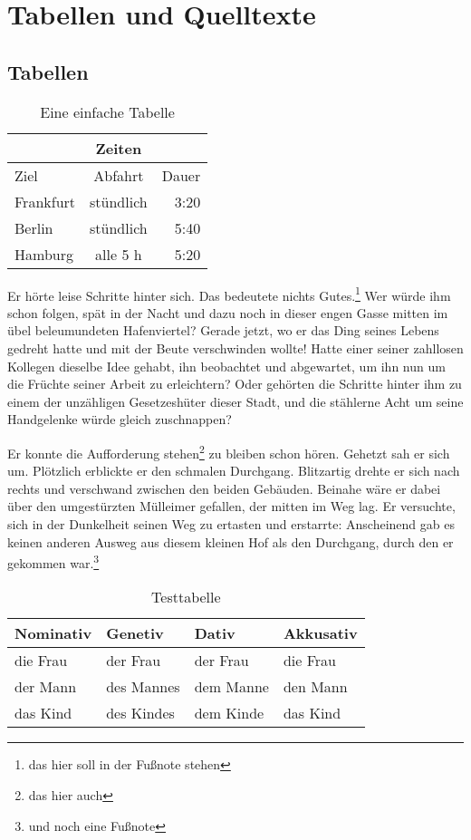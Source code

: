 \chapter{Tabellen und Quelltexte}
\section{Tabellen}
\blindtext

\begin{table}[htb]
  \centering
  \caption{Eine einfache Tabelle}
  \begin{tabular}{lcr}
          & Zeiten     &   \\ 
    \toprule
    Ziel      & Abfahrt    & Dauer \\ 
    \midrule
    Frankfurt & stündlich & 3:20 \\ 
    Berlin    & stündlich & 5:40 \\ 
    Hamburg   & alle 5 h  & 5:20 \\ 
    \bottomrule
  \end{tabular}
\end{table}

Er hörte leise Schritte hinter sich. Das bedeutete nichts Gutes.\footnote{das hier soll in der Fußnote stehen} Wer würde ihm schon folgen, spät in der Nacht und dazu noch in dieser engen Gasse mitten im übel beleumundeten Hafenviertel? Gerade jetzt, wo er das Ding seines Lebens gedreht hatte und mit der Beute verschwinden wollte! Hatte einer seiner zahllosen Kollegen dieselbe Idee gehabt, ihn beobachtet und abgewartet, um ihn nun um die Früchte seiner Arbeit zu erleichtern? Oder gehörten die Schritte hinter ihm zu einem der unzähligen Gesetzeshüter dieser Stadt, und die stählerne Acht um seine Handgelenke würde gleich zuschnappen?

Er konnte die Aufforderung stehen\footnote{das hier auch} zu bleiben schon hören. Gehetzt sah er sich um. Plötzlich erblickte er den schmalen Durchgang. Blitzartig drehte er sich nach rechts und verschwand zwischen den beiden Gebäuden. Beinahe wäre er dabei über den umgestürzten Mülleimer gefallen, der mitten im Weg lag. Er versuchte, sich in der Dunkelheit seinen Weg zu ertasten und erstarrte: Anscheinend gab es keinen anderen Ausweg aus diesem kleinen Hof als den Durchgang, durch den er gekommen war.\footnote{und noch eine Fußnote}

\begin{table}[htb]
  \centering
  \caption{Testtabelle}
  \begin{tabular}{@{}*{4}{l}@{}}
    \toprule
    Nominativ & Genetiv & Dativ & Akkusativ \\
    \midrule
    die Frau & der Frau   & der Frau  & die Frau \\
    der Mann & des Mannes & dem Manne & den Mann \\
    das Kind & des Kindes & dem Kinde & das Kind \\
    \bottomrule
  \end{tabular}
\end{table}

